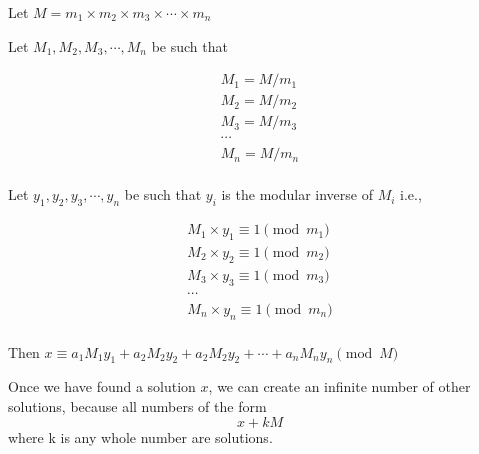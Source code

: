 \documentclass[twoside,12pt,a4paper,english]{book}
\theoremstyle{definition}
\theoremstyle{problemstyle}
\theoremstyle{problemstyle}
\theoremstyle{problemstyle}
\begin{document}
\begin{tcolorbox}[title=Solution]

Let $M = m_1 \times m_2 \times m_3 \times \cdots \times m_n$

Let $M_1, M_2, M_3, \cdots, M_n$ be such that

\[
\begin{array}{lcl}
M_1 = M/m_1 \\
M_2 = M/m_2 \\
M_3 = M/m_3 \\
\cdots \\
M_n = M/m_n \\
\end{array}
\]

Let $y_1, y_2, y_3, \cdots, y_n$ be such that $y_i$ is the modular inverse of $M_i$ i.e., 

\[
\begin{array}{lcl}
M_1 \times y_1 \equiv 1 \pmod{m_1}\\
M_2 \times y_2 \equiv 1 \pmod{m_2}\\
M_3 \times y_3 \equiv 1 \pmod{m_3}\\
\cdots \\
M_n \times y_n \equiv 1 \pmod{m_n}\\
\end{array}
\]


Then $x \equiv a_1M_1y_1 + a_2M_2y_2 + a_2M_2y_2 + \cdots + a_nM_ny_n \pmod M$

\vspace{5mm}

Once we have found a solution $x$,
we can create an infinite number of other solutions,
because all numbers of the form
\[x+kM\]
where k is any whole number are solutions.
\end{tcolorbox}
\end{document}
